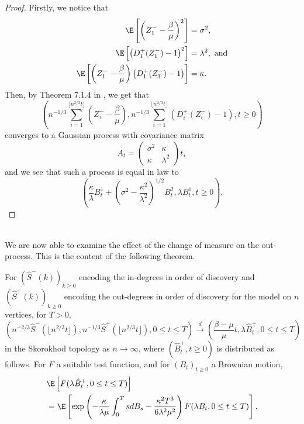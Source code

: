\begin{proof}
 Firstly, we notice that 
 \begin{align*}
     \E\left[\left(Z^-_1-\frac{\beta}{\mu}\right)^2\right]&=\sigma^2,\\
      \E\left[\left(D^+_1(Z^-_1)-1\right)^2\right]&=\lambda^2,\text{ and}\\
     \E\left[\left(Z^-_1-\frac{\beta}{\mu}\right)\left(D^+_1(Z^-_1)-1\right)\right]&=\kappa.\\
 \end{align*}
 Then, by Theorem 7.1.4 in \cite{ethierMarkovProcessesCharacterization1986}, we get that 
 $$\left(n^{-1/3}\sum\limits_{i=1}^{\lfloor  n^{2/3}t\rfloor} \left(Z^-_i-\frac{\beta}{\mu}\right),n^{-1/3}\sum\limits_{i=1}^{\lfloor  n^{2/3}t\rfloor} \left(D^+_i(Z^-_i)-1\right), t\geq 0\right)$$
 converges to a Gaussian process with covariance matrix
 $$A_t=\begin{pmatrix} \sigma^2  & \kappa \\ \kappa  & \lambda^2  \end{pmatrix}t,$$
 and we see that such a process is equal in law to
 $$\left(\frac{\kappa}{\lambda}B_t^1+\left(\sigma^2-\frac{\kappa^2}{\lambda^2}\right)^{1/2}B_t^2   ,\lambda B_t^1 ,t\geq 0\right).$$
 \end{proof}\\
 We are now able to examine the effect of the change of measure on the out-process. This is the content of the following theorem. 
\begin{theorem}\label{theorem.convaftermeasurechange} 
 For $\left(\hat{S}^-(k)\right)_{k\geq 0}$ encoding the in-degrees in order of discovery and   $\left(\hat{S}^+(k)\right)_{k\geq 0}$ encoding the out-degrees in order of discovery for the model on $n$ vertices, for $T>0$,
$$\left(n^{-2/3}\hat{S}^-\left(\lfloor n^{2/3} t\rfloor\right), n^{-1/3}\hat{S}^+\left(\lfloor  n^{2/3} t\rfloor\right), 0\leq t \leq T \right) \overset{d}{\to} \left( \frac{\beta-\mu}{\mu}t, \lambda\hat{B}_t^+, 0 \leq t \leq T \right)$$
in the Skorokhod topology as $n\to \infty$, where $(\hat{B}^+_t, t\geq 0)$ is distributed as follows.
For $F$ a suitable test function, and for $(B_t)_{t\geq 0}$ a Brownian motion,
\begin{align*} &\E\left[F(\lambda \hat{B}^+_t,0\leq t \leq T)\right]\\&=\E\left[\exp\left(-\frac{\kappa}{\lambda \mu} \int_0^T s dB_s -\frac{\kappa^2 T^3}{6\lambda^2 \mu^2}\right)F(\lambda B_t,   0\leq t \leq T)\right].\end{align*}

\end{theorem}
